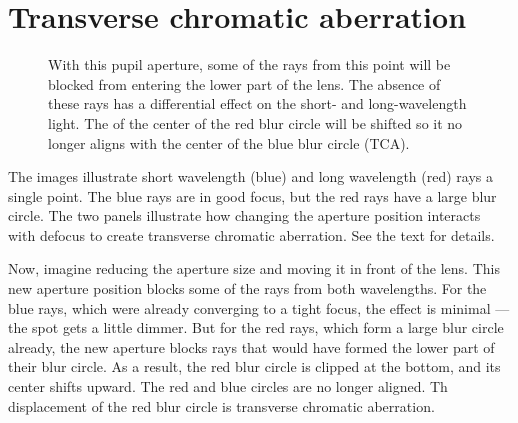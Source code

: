 \documentclass[
  letterpaper,
]{book}
\begin{document}
\section{Transverse chromatic aberration}

\begin{figure}


\caption{\label{fig-optics-transverse}With this pupil aperture, some of
the rays from this point will be blocked from entering the lower part of
the lens. The absence of these rays has a differential effect on the
short- and long-wavelength light. The of the center of the red blur
circle will be shifted so it no longer aligns with the center of the
blue blur circle (TCA).}

\end{figure}%

The images illustrate short wavelength (blue) and long wavelength (red)
rays a single point. The blue rays are in good focus, but the red rays
have a large blur circle. The two panels illustrate how changing the
aperture position interacts with defocus to create transverse chromatic
aberration. See the text for details.

Now, imagine reducing the aperture size and moving it in front of the
lens. This new aperture position blocks some of the rays from both
wavelengths. For the blue rays, which were already converging to a tight
focus, the effect is minimal ---the spot gets a little dimmer. But for
the red rays, which form a large blur circle already, the new aperture
blocks rays that would have formed the lower part of their blur circle.
As a result, the red blur circle is clipped at the bottom, and its
center shifts upward. The red and blue circles are no longer aligned. Th
displacement of the red blur circle is transverse chromatic aberration.
\end{document}
